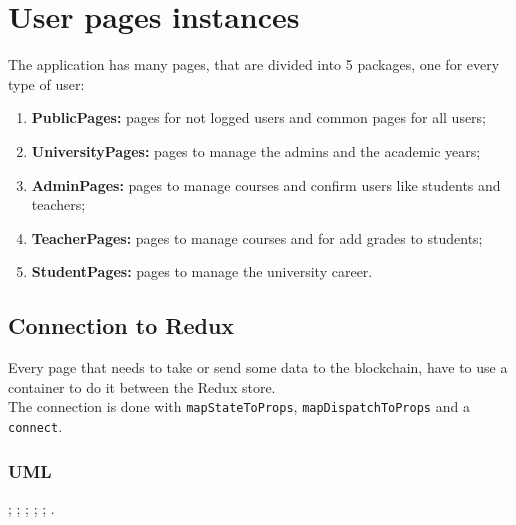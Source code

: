\documentclass[../react]{subfiles}
\begin{document}
	
	\section{User pages instances}
	The application has many pages, that are divided into 5 packages, one for every type of user:
	\begin{enumerate}
		\item \textbf{PublicPages: } pages for not logged users and common pages for all users;
		\item \textbf{UniversityPages: } pages to manage the admins and the academic years;
		\item \textbf{AdminPages: } pages to manage courses and confirm users like students and teachers;
		\item \textbf{TeacherPages: } pages to manage courses and for add grades to students;
		\item \textbf{StudentPages: } pages to manage the university career.
	\end{enumerate}

	\subsection{Connection to Redux}
	Every page that needs to take or send some data to the blockchain, have to use a container to do it between the Redux store.\\
	The connection is done with \texttt{mapStateToProps}, \texttt{mapDispatchToProps} and a \texttt{connect}.\\

	\subsubsection{UML}
	;
	;
	;
	;
	;
	.
\end{document}
